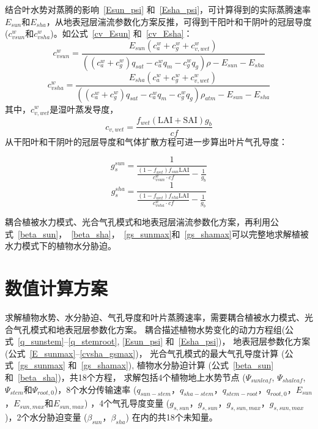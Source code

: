 结合叶水势对蒸腾的影响~\eqref{Esun_psi} 和~\eqref{Esha_psi}，可计算得到的实际蒸腾速率$E_{sun}$和$E_{sha}$，从地表冠层湍流参数化方案反推，可得到干阳叶和干阴叶的冠层导度 ($c_{vsun}^{w}$和$c_{vsha}^{w}$)。如公式~\eqref{cv_Esun} 和~\eqref{cv_Esha}：
\begin{equation}\label{cv_Esun}c_{vsun}^{w}=\frac{E_{sun}\left(c_a^w+c_g^w+c_{v,wet}^{w}\right)}{\left(\left(c_a^w+c_g^w\right)q_{sat}-c_a^w q_m - c_g^w q_g\right)\rho-E_{sun}-E_{sha}}
\end{equation}
%
\begin{equation}\label{cv_Esha}
c_{vsha}^{w}=\frac{E_{sha}\left(c_a^w+c_g^w+c_{v,wet}^{w}\right)}{\left(\left(c_a^w+c_g^w\right)q_{sat}-c_a^w q_m - c_g^w q_g\right)\rho_{atm}-E_{sun}-E_{sha}}
\end{equation}
其中，$c_{v,wet}^{w}$是湿叶蒸发导度，
\begin{equation}\label{cwet}
c_{v,wet}=\frac{f_{wet}\left(\text{LAI}+\text{SAI}\right)g_b}{cf}
\end{equation}
从干阳叶和干阴叶的冠层导度和气体扩散方程可进一步算出叶片气孔导度：

\begin{equation}\label{gssun_cvsun}
g_{s}^{sun} = \frac{1}{\frac{(1-f_{wet})f_{sun}\text{LAI}}{c_{vsun}^{w}\cdot cf}-\frac{1}{g_b}}
\end{equation}
\begin{equation}\label{gssun_cvsha}
g_{s}^{sha} = \frac{1}{\frac{(1-f_{wet})f_{sha}\text{LAI}}{c_{vsha}^{w}\cdot cf}-\frac{1}{g_b}}
\end{equation}


耦合植被水力模式、光合气孔模式和地表冠层湍流参数化方案，再利用公式~\eqref{beta_sun}，~\eqref{beta_sha}，~\eqref{gs_sunmax}和~\eqref{gs_shamax}可以完整地求解植被水力模式下的植物水分胁迫。


\section{数值计算方案}\label{数值计算方案}
求解植物水势、水分胁迫、气孔导度和叶片蒸腾速率，需要耦合植被水力模式、光合气孔模式和地表冠层参数化方案。
耦合描述植物水势变化的动力方程组(公式~\eqref{q_sunstem}--\eqref{q_stemroot}, \eqref{Esun_psi} 和~\eqref{Esha_psi})，
地表冠层参数化方案 (公式~\eqref{E_sunmax}--\eqref{cvsha_gsmax})，
光合气孔模式的最大气孔导度计算 (公式~\eqref{gs_sunmax} 和~\eqref{gs_shamax}), 植物水分胁迫计算 (公式~\eqref{beta_sun} 和~\eqref{beta_sha})，共18个方程，
求解包括4个植物地上水势节点 ($\Psi_{sunleaf}$, $\Psi_{shaleaf}$, $\Psi_{stem}$和$\Psi_{root,0}$)，8个水分传输速率 
($q_{sun-stem}$，$q_{sha-stem}$，$q_{stem-root}$，$q_{root,0}$，$E_{sun}$，$E_{sun,max}$和$E_{sun,max}$) ，4个气孔导度变量
 ($g_{s,sun}$，$g_{s,sun}$，$g_{s,sun,max}$，$g_{s,sun,max}$)，2个水分胁迫变量 ($\beta_{sun}$，$\beta_{sha}$) 在内的共18个未知量。

